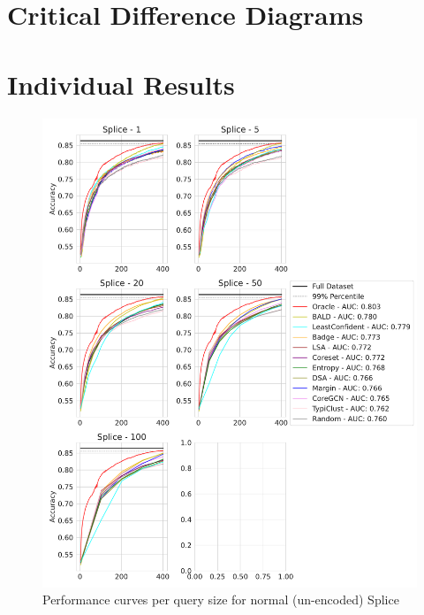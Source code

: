 \documentclass[]{article}
\begin{document}
\section{Critical Difference Diagrams}\label{app:cd_diagrams}

\section{Individual Results}\label{app:all_results}
\begin{figure}[H]
    \centering
    \caption{Performance curves per query size for normal (un-encoded) Splice}
    \includegraphics[width=\linewidth]{img/eval_splice}
\end{figure}
\end{document}
